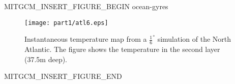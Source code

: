 \begin{rawhtml}MITGCM_INSERT_FIGURE_BEGIN ocean-gyres\end{rawhtml}
\begin{figure}
 \begin{center}
  \texttt{[image: part1/atl6.eps]}
 \end{center}
\caption{Instantaneous temperature map from a $\frac{1}{6}^{\circ }$
simulation of the North Atlantic. The figure
shows the temperature in the second layer (37.5m
deep).}
\label{fig:ocean-gyres}
\end{figure}
\begin{rawhtml}MITGCM_INSERT_FIGURE_END\end{rawhtml}

